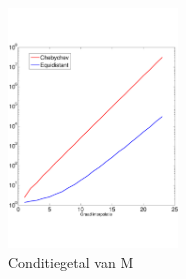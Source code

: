 \documentclass[a4paper, 12pt, titlepage]{report}
\begin{document}
 \begin{center}
 \begin{figure}[!hb]
 \centering
  	\includegraphics[width=0.4\textwidth]{condition.pdf}
  	\caption{Conditiegetal van M}
  	\label{condition}
  \end{figure}
 \end{center}
 
 
\end{document}
